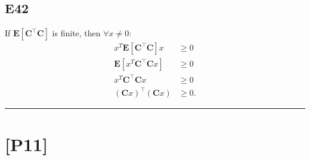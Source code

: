 \documentclass[12pt]{article}
\begin{document}
\subsection*{E42}
If $\mathbf{E}[\mathbf{C}^\top\mathbf{C}]$ is finite, then $\forall x \neq 0$:
\begin{equation*}
    \begin{split}
        x^T \mathbf{E}[\mathbf{C}^\top\mathbf{C}] x &\geq 0 \\
        \mathbf{E}[x^T \mathbf{C}^\top\mathbf{C}x ] &\geq 0 \\
        x^T \mathbf{C}^\top\mathbf{C}x &\geq 0 \\
        (\mathbf{C}x)^\top(\mathbf{C}x) &\geq 0.
    \end{split}
\end{equation*}


\hrule
\vspace{0.1cm}
\section*{[P11]}
\end{document}
